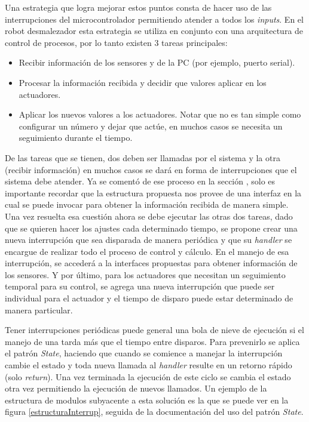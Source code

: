 Una estrategia que logra mejorar estos puntos consta de hacer uso de las interrupciones del microcontrolador permitiendo atender a todos los \textit{inputs}. En el robot desmalezador \cite{paperPomponio} esta estrategia se utiliza en conjunto con una arquitectura de control de procesos, por lo tanto existen 3 tareas principales:

\begin{itemize}
    \item Recibir información de los sensores y de la PC (por ejemplo, puerto serial).
    \item Procesar la información recibida y decidir que valores aplicar en los actuadores.
    \item Aplicar los nuevos valores a los actuadores. Notar que no es tan simple como configurar un número y dejar que actúe, en muchos casos se necesita un seguimiento durante el tiempo.
\end{itemize}

De las tareas que se tienen, dos deben ser llamadas por el sistema y la otra (recibir información) en muchos casos se dará en forma de interrupciones que el sistema debe atender. Ya se comentó de ese proceso en la sección , solo es importante recordar que la estructura propuesta nos provee de una interfaz en la cual se puede invocar para obtener la información recibida de manera simple. Una vez resuelta esa cuestión ahora se debe ejecutar las otras dos tareas, dado que se quieren hacer los ajustes cada determinado tiempo, se propone crear una nueva interrupción que sea disparada de manera periódica y que su \textit{handler} se encargue de realizar todo el proceso de control y cálculo. En el manejo de esa interrupción, se accederá a la interfaces propuestas para obtener información de los sensores. Y por último, para los actuadores que necesitan un seguimiento temporal para su control, se agrega una nueva interrupción que puede ser individual para el actuador y el tiempo de disparo puede estar determinado de manera particular.

Tener interrupciones periódicas puede general una bola de nieve de ejecución si el manejo de una tarda más que el tiempo entre disparos. Para prevenirlo se aplica el patrón \textit{State}, haciendo que cuando se comience a manejar la interrupción cambie el estado y toda nueva llamada al \textit{handler} resulte en un retorno rápido (solo \textit{return}). Una vez terminada la ejecución de este ciclo se cambia el estado otra vez permitiendo la ejecución de nuevos llamados. Un ejemplo de la estructura de modulos subyacente a esta solución es la que se puede ver en la figura \ref{estructuraInterrup}, seguida de la documentación del uso del patrón \textit{State}.

